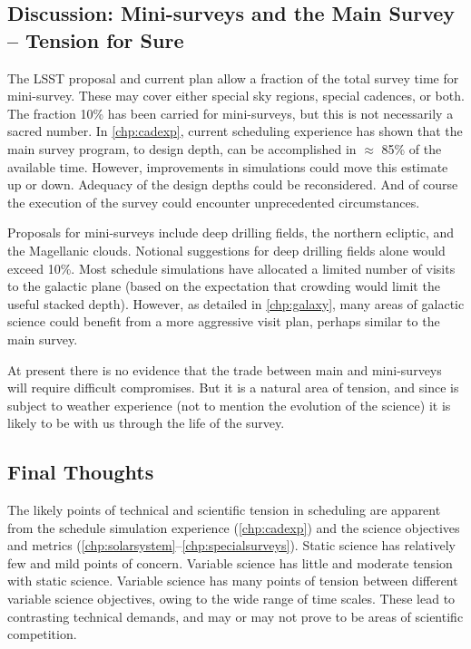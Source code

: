 
\subsection{Discussion: Mini-surveys and the Main Survey -- Tension for Sure}

The LSST proposal and current plan allow a fraction of the total survey
time for mini-survey. These may cover either special sky regions,
special cadences, or both. The fraction 10\% has been carried for
mini-surveys, but this is not necessarily a sacred number. In
\autoref{chp:cadexp}, current scheduling experience has shown that the
main survey program, to design depth, can be accomplished in $\approx$
85\% of the available time. However, improvements in simulations could
move this estimate up or down. Adequacy of the design depths could be
reconsidered.  And of course the execution of the survey could encounter
unprecedented circumstances.

Proposals for mini-surveys include deep drilling fields, the northern
ecliptic, and the Magellanic clouds. Notional suggestions for deep
drilling fields alone would exceed 10\%.   Most schedule simulations
have allocated a limited number of visits to the galactic plane (based
on the expectation that crowding would limit the useful stacked depth).
However, as detailed in \autoref{chp:galaxy}, many areas of galactic
science could benefit from a more aggressive visit plan, perhaps similar
to the main survey.

At present there is no evidence that the trade between main and
mini-surveys will require difficult compromises.  But it is a natural
area of tension, and since is subject to weather experience (not to
mention the evolution of the science) it is likely to be with us through
the life of the survey.


\subsection{Final Thoughts}

The likely points of technical and scientific tension in scheduling are
apparent from the schedule simulation experience (\autoref{chp:cadexp})
and the science objectives and metrics
(\autoref{chp:solarsystem}--\autoref{chp:specialsurveys}).  Static
science has relatively few and mild points of concern.  Variable science
has little and moderate tension with static science.  Variable science
has many points of tension between different variable science
objectives, owing to the wide range of time scales. These lead to
contrasting technical demands, and may or may not prove to be areas of
scientific competition.

